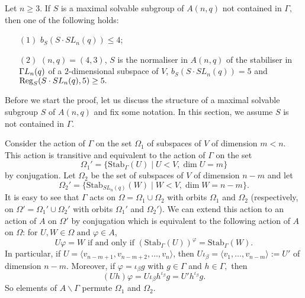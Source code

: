 \begin{T4}
Let $n\ge 3.$ If $S$ is a maximal solvable subgroup of $A(n,q)$ not contained in $\Gamma,$ then one of the following holds:
\begin{enumerate}
\item[$(1)$] $b_S(S \cdot SL_n(q))\le 4$;
\item[$(2)$] $(n,q)=(4,3)$, $S$ is the normaliser in $A(n,q)$ of the stabiliser in ${{\Gamma L}}_n(q)$ of a $2$-dimensional subspace of $V$, $b_S(S \cdot SL_n(q))=5$ and $\mathrm{Reg}_S(S \cdot SL_n(q),5)\ge 5.$
\end{enumerate}
\end{T4} 

Before we start the proof, let us discuss the structure of a maximal solvable subgroup
$S$ of $A(n,q)$ and fix some notation. In this section, we assume  $S$ is not contained in $\Gamma.$

Consider the action of $\Gamma$ on the set $\Omega_1$ of subspaces of $V$ of dimension $m<n.$ This action is transitive and equivalent to the action of $\Gamma$ on the set
$$\Omega_1'=\{\mathrm{Stab}_{\Gamma}(U) \mid U<V, \dim U= m\}$$ by conjugation. Let $\Omega_2$ be the set of subspaces of $V$ of dimension $n-m$ and let  $$\Omega_2'=\{\mathrm{Stab}_{SL_n(q)}(W) \mid W<V, \dim W= n-m\}.$$ It is easy to see that $\Gamma$ acts on $\Omega=\Omega_1 \cup \Omega_2$ with orbits $\Omega_1$ and $\Omega_2$ (respectively, on $\Omega'=\Omega_1' \cup \Omega_2'$ with orbits $\Omega_1'$ and $\Omega_2'$). We can extend this action to an action of $A$ on $\Omega'$ by conjugation which is equivalent to the following action of $A$ on $\Omega$:  for $U,W \in \Omega \text{ and } \varphi \in A$,
$$ U\varphi =W \text{ if and only if } 
(\mathrm{Stab}_{\Gamma}(U))^{\varphi}=\mathrm{Stab}_{\Gamma}(W).$$ 
In particular, if $U= \langle v_{n-m+1}, v_{n-m+2}, \ldots, v_n \rangle$, then $U\iota_{\beta}=\langle v_1, \ldots, v_{n-m}\rangle:=U'$ of dimension $n-m.$ Moreover, if $\varphi=\iota_{\beta}g$ with $g \in \Gamma$ and $h \in \Gamma,$ then 
$$(Uh)\varphi=U\iota_{\beta}h^{\iota_{\beta}}g=U'h^{\iota_{\beta}}g.$$  So elements of $A\backslash \Gamma$ permute $\Omega_1$ and $\Omega_2.$

